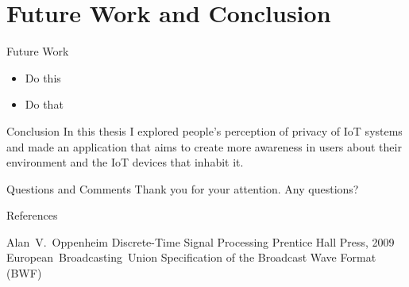 \documentclass[xcolor={svgnames},12pt,aspectratio=169,handout]{beamer}
\begin{document}
\section{Future Work and Conclusion}

\begin{frame}{Future Work}
    \begin{itemize}
        \item Do this
        \item Do that
    \end{itemize}
\end{frame}

\begin{frame}{Conclusion}
    In this thesis I explored people's perception of privacy of IoT systems and
    made an application that aims to create more awareness in users about their
    environment and the IoT devices that inhabit it.
\end{frame}

\begin{frame}{Questions and Comments}
    Thank you for your attention. Any questions?
\end{frame}

\begin{frame}{References}
    \begin{thebibliography}{10}
        \beamertemplatebookbibitems
        Alan~V.~Oppenheim
        \newblock Discrete-Time Signal Processing
        \newblock Prentice Hall Press, 2009
        \beamertemplatearticlebibitems
        European~Broadcasting~Union
        \newblock Specification of the Broadcast Wave Format (BWF)
    \end{thebibliography}
\end{frame}
\end{document}
